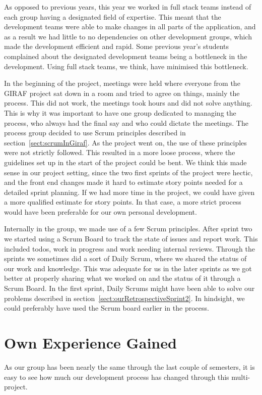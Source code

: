 As opposed to previous years, this year we worked in full stack teams instead of each group having a designated field of expertise. This meant that the development teams were able to make changes in all parts of the application, and as a result we had little to no dependencies on other development groups, which made the development efficient and rapid.
Some previous year's students complained about the designated development teams being a bottleneck in the development. Using full stack teams, we think, have minimised this bottleneck.


In the beginning of the project, meetings were held where everyone from the GIRAF project sat down in a room and tried to agree on things, mainly the process. This did not work, the meetings took hours and did not solve anything. This is why it was important to have one group dedicated to managing the process, who always had the final say and who could dictate the meetings.
The process group decided to use Scrum principles described in section~\ref{sect:scrumInGiraf}. As the project went on, the use of these principles were not strictly followed. This resulted in a more loose process, where the guidelines set up in the start of the project could be bent.
We think this made sense in our project setting, since the two first sprints of the project were hectic, and the front end changes made it hard to estimate story points needed for a detailed sprint planning. If we had more time in the project, we could have given a more qualified estimate for story points. In that case, a more strict process would have been preferable for our own personal development.

Internally in the group, we made use of a few Scrum principles. After sprint two we started using a Scrum Board to track the state of issues and report work. This included todos, work in progress and work needing internal reviews. Through the sprints we sometimes did a sort of Daily Scrum, where we shared the status of our work and knowledge. This was adequate for us in the later sprints as we got better at properly sharing what we worked on and the status of it through a Scrum Board. In the first sprint, Daily Scrums might have been able to solve our problems described in section~\ref{sect:ourRetrospectiveSprint2}. In hindsight, we could preferably have used the Scrum board earlier in the process.

\section{Own Experience Gained}
As our group has been nearly the same through the last couple of semesters, it is easy to see how much our development process has changed through this multi-project.

